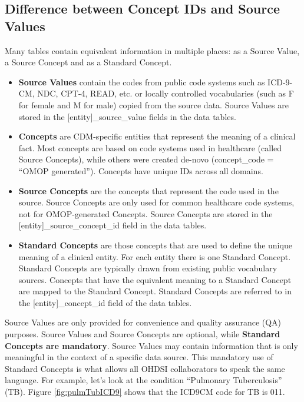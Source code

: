 \documentclass[11pt]{book}
\providecommand{\tightlist}{%
  \setlength{\itemsep}{0pt}\setlength{\parskip}{0pt}}
\theoremstyle{definition}
\theoremstyle{definition}
\theoremstyle{definition}
\theoremstyle{remark}
\begin{document}
\hypertarget{concepts-sources}{%
\subsection{Difference between Concept IDs and Source Values}\label{concepts-sources}}

Many tables contain equivalent information in multiple places: as a Source Value, a Source Concept and as a Standard Concept.

\begin{itemize}
\tightlist
\item
  \textbf{Source Values} contain the codes from public code systems such as ICD-9-CM, NDC, CPT-4, READ, etc. or locally controlled vocabularies (such as F for female and M for male) copied from the source data. Source Values are stored in the {[}entity{]}\_source\_value fields in the data tables.
\item
  \textbf{Concepts} are CDM-specific entities that represent the meaning of a clinical fact. Most concepts are based on code systems used in healthcare (called Source Concepts), while others were created de-novo (concept\_code = ``OMOP generated''). Concepts have unique IDs across all domains.
\item
  \textbf{Source Concepts} are the concepts that represent the code used in the source. Source Concepts are only used for common healthcare code systems, not for OMOP-generated Concepts. Source Concepts are stored in the {[}entity{]}\_source\_concept\_id field in the data tables.
\item
  \textbf{Standard Concepts} are those concepts that are used to define the unique meaning of a clinical entity. For each entity there is one Standard Concept. Standard Concepts are typically drawn from existing public vocabulary sources. Concepts that have the equivalent meaning to a Standard Concept are mapped to the Standard Concept. Standard Concepts are referred to in the {[}entity{]}\_concept\_id field of the data tables.
\end{itemize}

Source Values are only provided for convenience and quality assurance (QA) purposes. Source Values and Source Concepts are optional, while \textbf{Standard Concepts are mandatory}. Source Values may contain information that is only meaningful in the context of a specific data source. This mandatory use of Standard Concepts is what allows all OHDSI collaborators to speak the same language. For example, let's look at the condition ``Pulmonary Tuberculosis'' (TB). Figure \ref{fig:pulmTubICD9} shows that the ICD9CM code for TB is 011.
\end{document}
